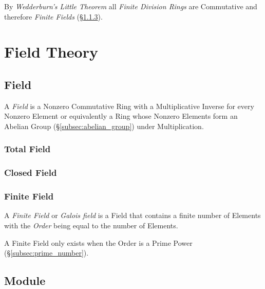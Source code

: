By \emph{Wedderburn's Little Theorem} all \emph{Finite Division Rings}
are Commutative and therefore \emph{Finite Fields}
(\S\ref{subsec:finite_field}).



\section{Field Theory}\label{sec:field_theory}

\subsection{Field}\label{subsec:field}

A \emph{Field} is a Nonzero Commutative Ring with a Multiplicative
Inverse for every Nonzero Element or equivalently a Ring whose Nonzero
Elements form an Abelian Group (\S\ref{subsec:abelian_group}) under
Multiplication.



\subsubsection{Total Field}\label{subsec:total_field}

\subsubsection{Closed Field}\label{subsec:closed_field}

\subsubsection{Finite Field}\label{subsec:finite_field}

A \emph{Finite Field} or \emph{Galois field} is a Field that contains
a finite number of Elements with the \emph{Order} being equal to the
number of Elements.

A Finite Field only exists when the Order is a Prime Power
(\S\ref{subsec:prime_number}).



\subsection{Module}

